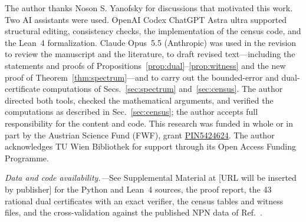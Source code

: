 \documentclass[
  aps,
  pra,
  reprint,
  nofootinbib
]{revtex4-2}
\begin{document}
\begin{acknowledgments}
The author thanks Noson S. Yanofsky for discussions that motivated this
work. Two AI assistants were used. OpenAI Codex ChatGPT
Astra ultra
supported structural editing, consistency checks, the implementation of the
census code, and the Lean~4 formalization. Claude Opus~5.5 (Anthropic) was
used in the revision to review the manuscript and the literature, to draft
revised text---including the statements and proofs of
Propositions~\ref{prop:dual}--\ref{prop:witness} and the new proof of
Theorem~\ref{thm:spectrum}---and to carry out the bounded-error and
dual-certificate computations of Secs.~\ref{sec:spectrum} and~\ref{sec:census}.
The author directed both tools, checked the mathematical arguments, and
verified the computations as described in Sec.~\ref{sec:census}; the author
accepts full responsibility for the content and code. This research
was funded in whole or in part by the Austrian Science Fund (FWF), grant
\href{https://doi.org/10.55776/PIN5424624}{PIN5424624}. The author
acknowledges TU Wien Bibliothek for support through its Open Access Funding
Programme.
\end{acknowledgments}

\noindent\textit{Data and code availability.---}See Supplemental Material at
[URL will be inserted by publisher] for the Python and Lean~4 sources, the
proof report, the 43 rational dual certificates with an exact verifier, the
census tables and witness files, and the cross-validation against the
published NPN data of Ref.~\cite{MontanaroJozsaMitchison2015}.


\end{document}
